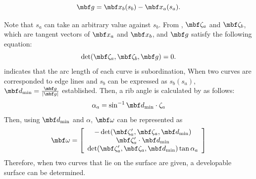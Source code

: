 \documentclass[E]{scitrans}
\begin{document}
\begin{equation}
\mbold{g} = \mbold{x}_b(s_b)-\mbold{x}_a(s_a).
\end{equation}

Note that $s_a$ can take an arbitrary value against $ s_b $. From \cite{MyRef2}, $ \zetavec_a$ and $\zetavec_b $, which are tangent vectors of $ \mbold{x}_a $ and $ \mbold{x}_b $, and $ \mbold{g} $ satisfy the following equation:
\begin{equation}
	\det (\zetavec_a, \zetavec_b, \mbold{g})=0. 
	\label{eq:Cond1}
\end{equation}
 indicates that the arc length of each curve is subordination, When two curves are corresponded to edge lines and $ s_b $ can be expressed as $s_b(s_a)$, $ \mbold{d}_{\min}  = \frac{\mbold{g}}{|\mbold{g}|}$ established. Then, a rib angle is calculated by  as follows:
\begin{equation}\label{eq:alphaEq}
	\alpha_a = \sin^{-1} \mbold{d}_{\min} \cdot \zeta_a
\end{equation}
Then, using $ \mbold{d}_{\min} $ and $\alpha $, $ \mbold{\omega} $ can be represented as
\begin{equation}\label{eq:omegaVec}
\mbold{\omega} = \left[\begin{array}{c} -\det(\zetavec_a',\zetavec_a, \mbold{d}_{\min} ) \\ \zetavec_a' \cdot \mbold{d}_{\min} \\ \det(\zetavec_a',\zetavec_a, \mbold{d}_{\min} ) \tan \alpha_a \end{array}\right] 
\end{equation}
Therefore, when two curves that lie on the surface are given, a developable surface can be determined.
\end{document}

